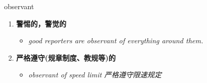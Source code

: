 
\begin{frame}
{\huge observant}
\begin{center}
\begin{enumerate}\Large
  \item \textbf{警惕的，警觉的}
  \begin{itemize}
    \item \em{\Large{good reporters are observant of everything around them.}}
  \end{itemize}
  \item \textbf{严格遵守(规章制度、教规等)的}
  \begin{itemize}
    \item \em{\Large{observant of speed limit 严格遵守限速规定}}
  \end{itemize}
\end{enumerate}
\end{center}
\end{frame}

